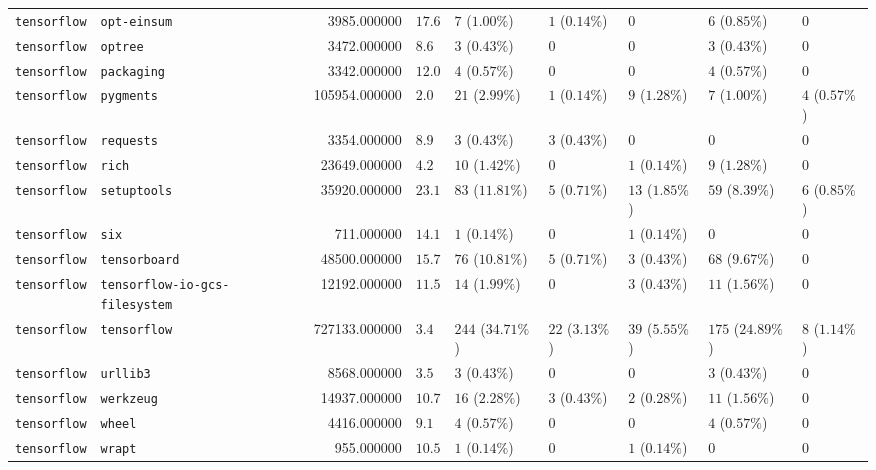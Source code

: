 \begin{table}
\begin{tabular}{llrllllll}
\texttt{tensorflow} & \texttt{opt-einsum} & 3985.000000 & $17.6$ & $7$ ($1.00\%$) & $1$ ($0.14\%$) & $0$ & $6$ ($0.85\%$) & $0$ \\
\texttt{tensorflow} & \texttt{optree} & 3472.000000 & $8.6$ & $3$ ($0.43\%$) & $0$ & $0$ & $3$ ($0.43\%$) & $0$ \\
\texttt{tensorflow} & \texttt{packaging} & 3342.000000 & $12.0$ & $4$ ($0.57\%$) & $0$ & $0$ & $4$ ($0.57\%$) & $0$ \\
\texttt{tensorflow} & \texttt{pygments} & 105954.000000 & $2.0$ & $21$ ($2.99\%$) & $1$ ($0.14\%$) & $9$ ($1.28\%$) & $7$ ($1.00\%$) & $4$ ($0.57\%$) \\
\texttt{tensorflow} & \texttt{requests} & 3354.000000 & $8.9$ & $3$ ($0.43\%$) & $3$ ($0.43\%$) & $0$ & $0$ & $0$ \\
\texttt{tensorflow} & \texttt{rich} & 23649.000000 & $4.2$ & $10$ ($1.42\%$) & $0$ & $1$ ($0.14\%$) & $9$ ($1.28\%$) & $0$ \\
\texttt{tensorflow} & \texttt{setuptools} & 35920.000000 & $23.1$ & $83$ ($11.81\%$) & $5$ ($0.71\%$) & $13$ ($1.85\%$) & $59$ ($8.39\%$) & $6$ ($0.85\%$) \\
\texttt{tensorflow} & \texttt{six} & 711.000000 & $14.1$ & $1$ ($0.14\%$) & $0$ & $1$ ($0.14\%$) & $0$ & $0$ \\
\texttt{tensorflow} & \texttt{tensorboard} & 48500.000000 & $15.7$ & $76$ ($10.81\%$) & $5$ ($0.71\%$) & $3$ ($0.43\%$) & $68$ ($9.67\%$) & $0$ \\
\texttt{tensorflow} & \texttt{tensorflow-io-gcs-filesystem} & 12192.000000 & $11.5$ & $14$ ($1.99\%$) & $0$ & $3$ ($0.43\%$) & $11$ ($1.56\%$) & $0$ \\
\texttt{tensorflow} & \texttt{tensorflow} & 727133.000000 & $3.4$ & $244$ ($34.71\%$) & $22$ ($3.13\%$) & $39$ ($5.55\%$) & $175$ ($24.89\%$) & $8$ ($1.14\%$) \\
\texttt{tensorflow} & \texttt{urllib3} & 8568.000000 & $3.5$ & $3$ ($0.43\%$) & $0$ & $0$ & $3$ ($0.43\%$) & $0$ \\
\texttt{tensorflow} & \texttt{werkzeug} & 14937.000000 & $10.7$ & $16$ ($2.28\%$) & $3$ ($0.43\%$) & $2$ ($0.28\%$) & $11$ ($1.56\%$) & $0$ \\
\texttt{tensorflow} & \texttt{wheel} & 4416.000000 & $9.1$ & $4$ ($0.57\%$) & $0$ & $0$ & $4$ ($0.57\%$) & $0$ \\
\texttt{tensorflow} & \texttt{wrapt} & 955.000000 & $10.5$ & $1$ ($0.14\%$) & $0$ & $1$ ($0.14\%$) & $0$ & $0$ \\
\bottomrule
\end{tabular}
\end{table}
